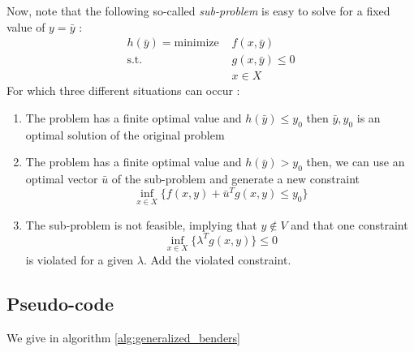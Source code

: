 Now, note that the following so-called \textit{sub-problem} is easy to solve for a fixed value of $y = \bar y$ : 
\begin{align*}
    h(\bar y) = 
    \textrm{minimize } & f(x, \bar y)\\
    \textrm{s.t. } & g(x, \bar y) \le 0\\
    & x\in X
\end{align*}
For which three different situations can occur :
\begin{enumerate}
    \item The problem has a finite optimal value and $h(\bar y) \le y_0$ then $\bar y, y_0$ is an optimal solution of the original problem
    \item The problem has a finite optimal value and $h(\bar y) > y_0$ then, we can use an optimal vector $\bar u$ of the sub-problem and generate a new constraint 
    \[ \inf_{x\in X}\{ f(x,y) + \bar u^Tg(x,y) \le y_0 \} \]
    \item The sub-problem is not feasible, implying that $y\notin V$ and that one constraint 
    \[ \inf_{x\in X}\{ \lambda^Tg(x, y) \} \le 0 \]
    is violated for a given $\lambda$. Add the violated constraint. 
\end{enumerate}

\subsection{Pseudo-code}

We give in algorithm \ref{alg:generalized_benders}

